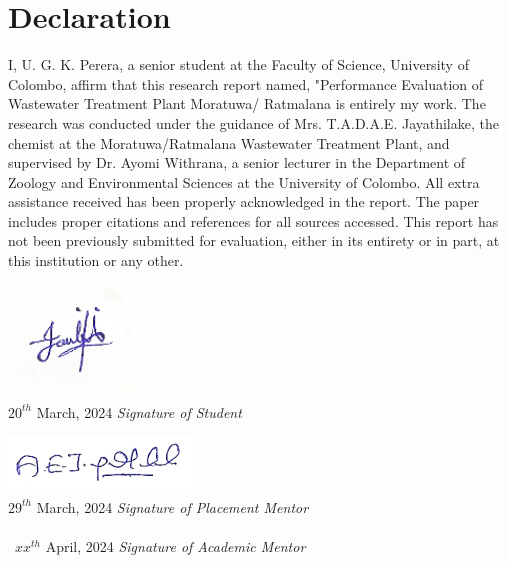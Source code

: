 \newpage
\section*{\centering Declaration}

  \vspace{0.5cm}

I, U. G. K. Perera, a senior student at the Faculty of Science, University of Colombo, affirm that this research report named, "Performance Evaluation of Wastewater Treatment Plant Moratuwa/ Ratmalana is entirely my work. The research was conducted under the guidance of Mrs. T.A.D.A.E. Jayathilake, the chemist at the Moratuwa/Ratmalana Wastewater Treatment Plant, and supervised by Dr. Ayomi Withrana, a senior lecturer in the Department of Zoology and Environmental Sciences at the University of Colombo. All extra assistance received has been properly acknowledged in the report. The paper includes proper citations and references for all sources accessed. This report has not been previously submitted for evaluation, either in its entirety or in part, at this institution or any other.

  \vspace{2cm}

 


 \hspace*{\fill} \includegraphics[height=3cm]{assets/sign_gavini.png} \\
 \hspace{0.5cm} $20^{th}$ March, 2024  \hspace*{\fill} \textit{Signature of Student}\\

  \vspace{0.5cm}

  \hspace*{\fill} \includegraphics[height=1.5cm]{assets/sign_placement_mentor.png} \\
  \hspace{1cm} $29^{th}$ March, 2024 \hspace*{\fill} \textit{Signature of Placement Mentor}\\

  \hspace*{\fill}  \\
  \hspace{1cm} \ $xx^{th}$ April, 2024 \hspace*{\fill} \textit{Signature of Academic Mentor}  \\


\clearpage